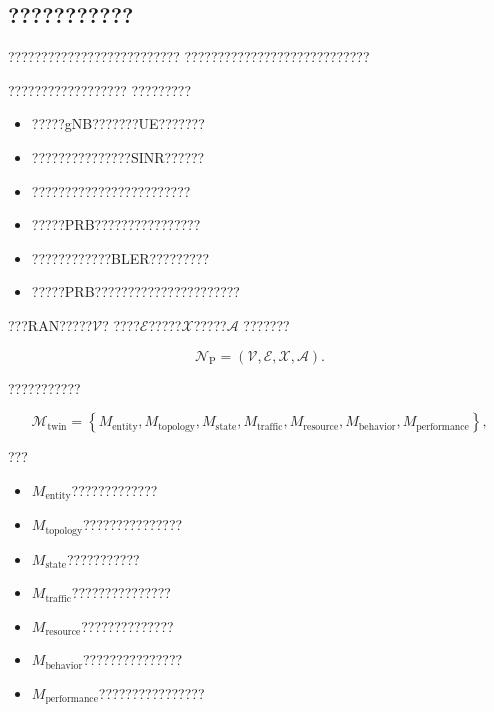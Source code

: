 \subsection*{???????????}

??????????????????????????
????????????????????????????

??????????????????
?????????

\begin{itemize}
    \item ?????gNB???????UE???????
    \item ???????????????SINR??????
    \item ????????????????????????
    \item ?????PRB????????????????
    \item ????????????BLER?????????
    \item ?????PRB??????????????????????
\end{itemize}

???RAN?????$\mathcal{V}$?
????$\mathcal{E}$?????$\mathcal{X}$?????$\mathcal{A}$
???????

\begin{equation}
\mathcal{N}_{\mathrm{P}}
=
\left(
\mathcal{V},
\mathcal{E},
\mathcal{X},
\mathcal{A}
\right).
\label{eq:physical_ran_representation}
\end{equation}

???????????

\begin{equation}
\mathcal{M}_{\mathrm{twin}}
=
\left\{
M_{\mathrm{entity}},
M_{\mathrm{topology}},
M_{\mathrm{state}},
M_{\mathrm{traffic}},
M_{\mathrm{resource}},
M_{\mathrm{behavior}},
M_{\mathrm{performance}}
\right\},
\label{eq:twin_model_system}
\end{equation}

???

\begin{itemize}
    \item $M_{\mathrm{entity}}$?????????????
    \item $M_{\mathrm{topology}}$???????????????
    \item $M_{\mathrm{state}}$???????????
    \item $M_{\mathrm{traffic}}$???????????????
    \item $M_{\mathrm{resource}}$??????????????
    \item $M_{\mathrm{behavior}}$???????????????
    \item $M_{\mathrm{performance}}$????????????????
\end{itemize}


